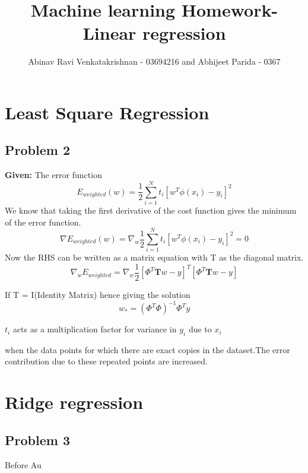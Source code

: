 \documentclass[5pt,a4paper]{article}
\begin{document}
	\title{Machine learning Homework- Linear regression}
	\author{Abinav Ravi Venkatakrishnan - 03694216 and Abhijeet Parida - 0367}
	\maketitle
	
	\section{Least Square Regression}
	\subsection*{Problem 2}
	\textbf{Given:} The error function 
	\begin{equation}
	E_{weighted}(w) = \frac{1}{2}\sum_{i=1}^{N}t_i[w^T \phi(x_i)-y_i]^2
	\end{equation}
	We know that taking the first derivative of the cost function gives the minimum of the error function.
	\begin{equation}
	\nabla E_{weighted}(w) = \nabla_w \frac{1}{2}\sum_{i=1}^{N}t_i[w^T \phi(x_i)-y_i]^2 = 0
	\end{equation}
	Now the RHS can be written as a matrix equation with T as the diagonal matrix. 
	\begin{equation}
	\nabla_w E_{weighted} = \nabla_w \frac{1}{2}  [\Phi^T\textbf{T}w - y]^T[\Phi^T\textbf{T}w - y]
	\end{equation} 
	
	If T = I(Identity Matrix) hence giving the solution
	\begin{equation}
	w_* = (\Phi^T\Phi )^{-1} \Phi^T y 
	\end{equation}
	
	$t_i$ acts as a multiplication factor for variance in $y_i$ due to $x_i$
	
	when the data points for which there are exact copies in the dataset.The error contribution due to these repeated points are increased. 
	
	\section{Ridge regression}
	\subsection*{Problem 3}
	Before Au
	
	
	
\end{document}
